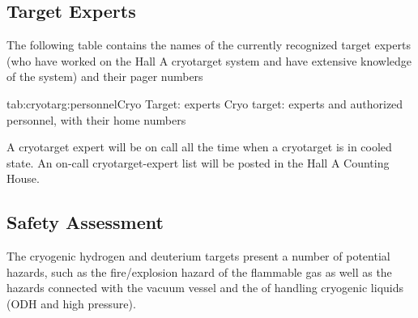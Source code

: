 
\begin{safetyen}{10}{10}
\section{Target Experts}
\end{safetyen}

The following table contains the names of the currently recognized target 
experts (who have worked on the Hall A cryotarget system and
have extensive knowledge of the system)
and their pager numbers

\begin{namestab}{tab:cryotarg:personnel}{Cryo Target: experts}{%
   Cryo target: experts and authorized personnel, with their home numbers}
\end{namestab}

\par
A cryotarget expert will be on call all the time when
a cryotarget is in cooled state.
An on-call cryotarget-expert list will be posted in the 
Hall A Counting House. 



\begin{safetyen}{10}{5}
\section{Safety Assessment}
\label{sec:target-cryo-safety}

The cryogenic hydrogen and deuterium targets present a number of potential
hazards, such as the
fire/explosion hazard of the flammable gas as well as the hazards
connected with
the vacuum vessel and the of handling cryogenic liquids
(ODH and high pressure). 
\end{safetyen}

